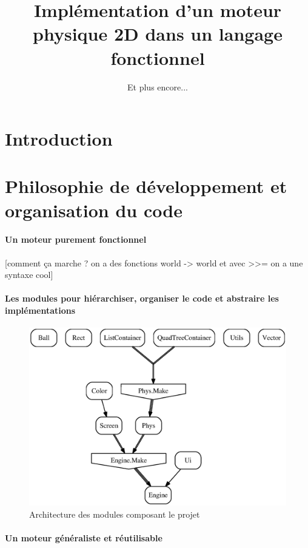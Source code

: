 \documentclass[a4paper]{scrartcl}
\title{Implémentation d'un moteur physique 2D dans un langage fonctionnel}
\subtitle{Et plus encore...}
\begin{document}
\maketitle

\tableofcontents

\newpage

\section*{Introduction}

\section{Philosophie de développement et organisation du code}
\paragraph{Un moteur purement fonctionnel}

[comment ça marche ? on a des fonctions world -> world et avec >>= on
a une syntaxe cool]
\paragraph{Les modules pour hiérarchiser, organiser le code et
  abstraire les implémentations}
\begin{figure}[h]
  \centering
  \includegraphics[scale = 0.7]{modules.eps}  
  \caption{Architecture des modules composant le projet}
  \label{fig:modules}
\end{figure}

\paragraph{Un moteur généraliste et réutilisable}
\end{document}
